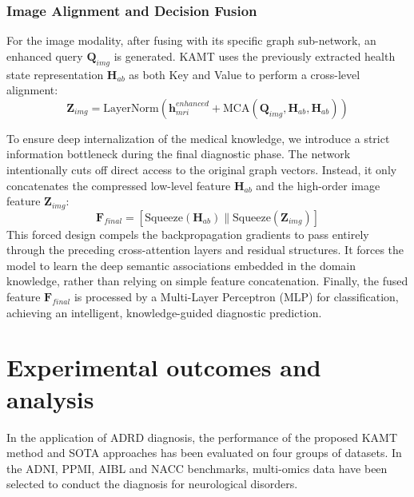 \documentclass[lettersize,journal]{IEEEtran}
\begin{document}
\subsubsection{Image Alignment and Decision Fusion}

For the image modality, after fusing with its specific graph sub-network, an enhanced query $\mathbf{Q}_{img}$ is generated. KAMT uses the previously extracted health state representation $\mathbf{H}_{ab}$ as both Key and Value to perform a cross-level alignment:
\begin{equation}
\mathbf{Z}_{img} = \mathrm{LayerNorm}(\mathbf{h}_{mri}^{enhanced} + \mathrm{MCA}(\mathbf{Q}_{img}, \mathbf{H}_{ab}, \mathbf{H}_{ab}))
\label{eq:mri_alignment}
\end{equation}

To ensure deep internalization of the medical knowledge, we introduce a strict information bottleneck during the final diagnostic phase. The network intentionally cuts off direct access to the original graph vectors. Instead, it only concatenates the compressed low-level feature $\mathbf{H}_{ab}$ and the high-order image feature $\mathbf{Z}_{img}$:
\begin{equation}
\mathbf{F}_{final} = [ \mathrm{Squeeze}(\mathbf{H}_{ab}) \parallel \mathrm{Squeeze}(\mathbf{Z}_{img}) ]
\label{eq:final_fusion}
\end{equation}
This forced design compels the backpropagation gradients to pass entirely through the preceding cross-attention layers and residual structures. It forces the model to learn the deep semantic associations embedded in the domain knowledge, rather than relying on simple feature concatenation. Finally, the fused feature $\mathbf{F}_{final}$ is processed by a Multi-Layer Perceptron (MLP) for classification, achieving an intelligent, knowledge-guided diagnostic prediction.














\section{Experimental outcomes and analysis}

    In the application of ADRD diagnosis, the performance of the proposed KAMT method and SOTA approaches has been evaluated on four groups of datasets. In the ADNI, PPMI, AIBL and NACC benchmarks, multi-omics data have been selected to conduct the diagnosis for neurological disorders.
\end{document}
